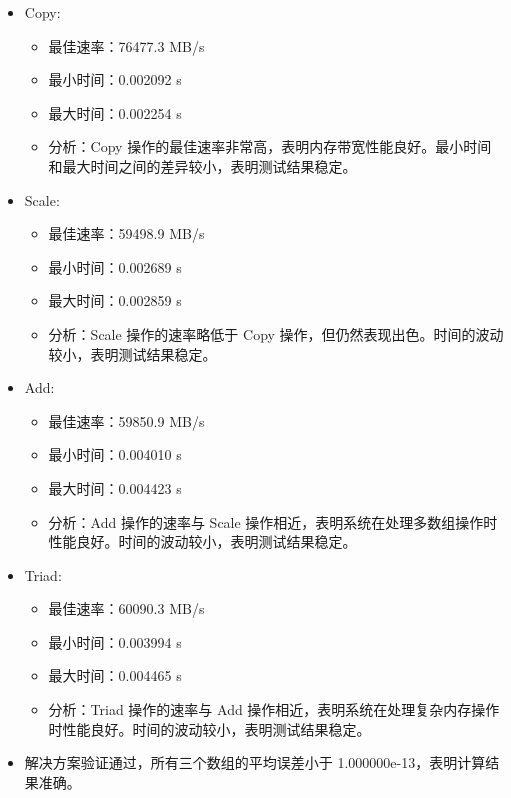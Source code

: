 \documentclass[UTF8]{report}
\begin{document}
\begin{enumerate}[label=(\arabic*)]
    \begin{itemize}
        \item Copy:
        \begin{itemize}
            \item 最佳速率：76477.3 MB/s
            \item 最小时间：0.002092 s
            \item 最大时间：0.002254 s
            \item 分析：Copy 操作的最佳速率非常高，表明内存带宽性能良好。最小时间和最大时间之间的差异较小，表明测试结果稳定。
        \end{itemize}
        \item Scale:
        \begin{itemize}
            \item 最佳速率：59498.9 MB/s
            \item 最小时间：0.002689 s
            \item 最大时间：0.002859 s
            \item 分析：Scale 操作的速率略低于 Copy 操作，但仍然表现出色。时间的波动较小，表明测试结果稳定。
        \end{itemize}
        \item Add:
        \begin{itemize}
            \item 最佳速率：59850.9 MB/s
            \item 最小时间：0.004010 s
            \item 最大时间：0.004423 s
            \item 分析：Add 操作的速率与 Scale 操作相近，表明系统在处理多数组操作时性能良好。时间的波动较小，表明测试结果稳定。
        \end{itemize}
        \item Triad:
        \begin{itemize}
            \item 最佳速率：60090.3 MB/s
            \item 最小时间：0.003994 s
            \item 最大时间：0.004465 s
            \item 分析：Triad 操作的速率与 Add 操作相近，表明系统在处理复杂内存操作时性能良好。时间的波动较小，表明测试结果稳定。
        \end{itemize}
        \item 解决方案验证通过，所有三个数组的平均误差小于 1.000000e-13，表明计算结果准确。
    \end{itemize}


\end{enumerate}
\end{document}
